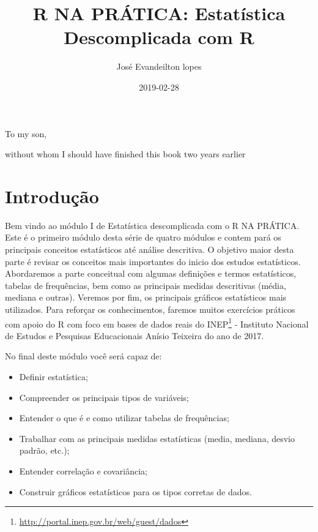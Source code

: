 \documentclass[12pt,]{style/krantz}
\title{R NA PRÁTICA: Estatística Descomplicada com R}
\author{José Evandeilton lopes}
\date{2019-02-28}
\providecommand{\tightlist}{%
  \setlength{\itemsep}{0pt}\setlength{\parskip}{0pt}}
\renewcommand{\href}[2]{#2\footnote{\url{#1}}}
\theoremstyle{definition}
\theoremstyle{definition}
\theoremstyle{definition}
\theoremstyle{remark}
\begin{document}
\maketitle


\thispagestyle{empty}

\begin{center}
To my son,

without whom I should have finished this book two years earlier
\end{center}

\setlength{\abovedisplayskip}{-5pt}
\setlength{\abovedisplayshortskip}{-5pt}

{
\setcounter{tocdepth}{2}
\tableofcontents
}
\listoftables
\listoffigures
\hypertarget{introducao}{%
\chapter*{Introdução}\label{introducao}}


Bem vindo ao módulo I de Estatística descomplicada com o R NA PRÁTICA. Este é o primeiro módulo desta série de quatro módulos e contem pará os principais conceitos estatísticos até análise descritiva. O objetivo maior desta parte é revisar os conceitos mais importantes do inicio dos estudos estatísticos. Abordaremos a parte conceitual com algumas definições e termos estatísticos, tabelas de frequências, bem como as principais medidas descritivas (média, mediana e outras). Veremos por fim, os principais gráficos estatísticos mais utilizados. Para reforçar os conhecimentos, faremos muitos exercícios práticos com apoio do R com foco em bases de dados reais do \href{http://portal.inep.gov.br/web/guest/dados}{INEP} - Instituto Nacional de Estudos e Pesquisas Educacionais Anísio Teixeira do ano de 2017.

No final deste módulo você será capaz de:

\begin{itemize}
\tightlist
\item
  Definir estatística;
\item
  Compreender os principais tipos de variáveis;
\item
  Entender o que é e como utilizar tabelas de frequências;
\item
  Trabalhar com as principais medidas estatísticas (media, mediana, desvio padrão, etc.);
\item
  Entender correlação e covariância;
\item
  Construir gráficos estatísticos para os tipos corretas de dados.
\end{itemize}
\end{document}
